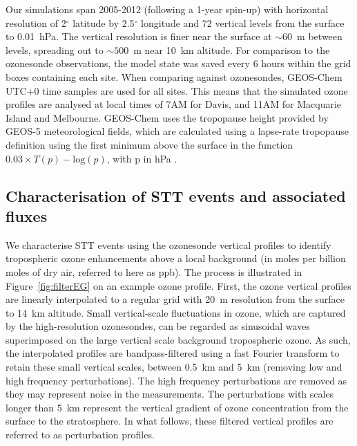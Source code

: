 \documentclass[acp, manuscript]{copernicus} %
\begin{document}
    Our simulations span 2005-2012 (following a 1-year spin-up) with horizontal resolution of 2$^{\circ}$ latitude by 2.5$^{\circ}$ longitude and 72 vertical levels from the surface to 0.01~hPa.
    The vertical resolution is finer near the surface at $\sim 60$~m between levels, spreading out to $\sim 500$~m near 10~km altitude.
    For comparison to the ozonesonde observations, the model state was saved every 6 hours within the grid boxes containing each site.
    When comparing against ozonesondes, GEOS-Chem UTC+0 time samples are used for all sites.
    This means that the simulated ozone profiles are analysed at local times of 7AM for Davis, and 11AM for Macquarie Island and Melbourne.
    GEOS-Chem uses the tropopause height provided by GEOS-5 meteorological fields, which are calculated using a lapse-rate tropopause definition using the first minimum above the surface in the function $0.03 \times T(p) - \mathrm{log}(p)$, with p in hPa \citep{Rienecker2008}.
    
  \subsection{Characterisation of STT events and associated fluxes}
    \label{sec:CharacterisationOfSTTs}
    
    We characterise STT events using the ozonesonde vertical profiles to identify tropospheric ozone enhancements above a local background (in moles per billion moles of dry air, referred to here as ppb).
    The process is illustrated in Figure~\ref{fig:filterEG} on an example ozone profile.
    First, the ozone vertical profiles are linearly interpolated to a regular grid with 20~m resolution from the surface to 14~km altitude. 
    Small vertical-scale fluctuations in ozone, which are captured by the high-resolution ozonesondes, can be regarded as sinusoidal waves superimposed on the large vertical scale background tropospheric ozone.
    As such, the interpolated profiles are bandpass-filtered using a fast Fourier transform \citep{Press1992} to retain these small vertical scales, between 0.5~km and 5~km (removing low and high frequency perturbations).
    The high frequency perturbations are removed as they may represent noise in the measurements.
    The perturbations with scales longer than 5~km represent the vertical gradient of ozone concentration from the surface to the stratosphere.
    In what follows, these filtered vertical profiles are referred to as perturbation profiles.
    
\end{document}
